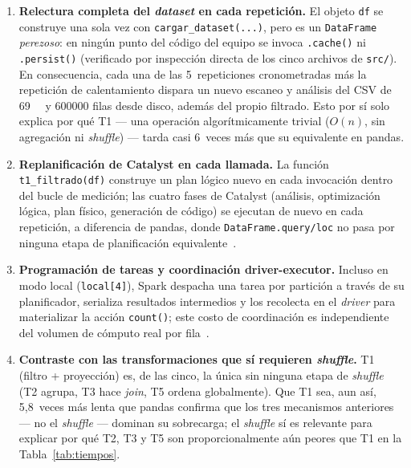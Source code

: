 \documentclass[11pt,a4paper]{article}
\begin{document}
\begin{enumerate}
  \item \textbf{Relectura completa del \textit{dataset} en cada repetici\'on.} El objeto
  \texttt{df} se construye una sola vez con \texttt{cargar\_dataset(.\allowbreak{}.\allowbreak{}.\allowbreak{})}, pero es un
  \texttt{DataFrame} \emph{perezoso}: en ning\'un punto del c\'odigo del equipo se invoca
  \texttt{.\allowbreak{}cache()} ni \texttt{.\allowbreak{}persist()} (verificado por inspecci\'on directa de los cinco
  archivos de \texttt{src/\allowbreak{}}). En consecuencia, cada una de las 5~repeticiones cronometradas
  m\'as la repetici\'on de calentamiento dispara un nuevo escaneo y an\'alisis del CSV de
  \SI{69}{\mega\byte} y \num{600000} filas desde disco, adem\'as del propio filtrado. Esto por
  s\'i solo explica por qu\'e T1 --- una operaci\'on algor\'itmicamente trivial ($O(n)$, sin
  agregaci\'on ni \textit{shuffle}) --- tarda casi 6~veces m\'as que su equivalente en pandas.
  \item \textbf{Replanificaci\'on de Catalyst en cada llamada.} La funci\'on
  \texttt{t1\_filtrado(df)} construye un plan l\'ogico nuevo en cada invocaci\'on dentro del
  bucle de medici\'on; las cuatro fases de Catalyst (an\'alisis, optimizaci\'on l\'ogica, plan
  f\'isico, generaci\'on de c\'odigo) se ejecutan de nuevo en cada repetici\'on, a diferencia
  de pandas, donde \texttt{DataFrame.\allowbreak{}query/\allowbreak{}loc} no pasa por ninguna etapa de planificaci\'on
  equivalente~\cite{armbrust2015sparksql}.
  \item \textbf{Programaci\'on de tareas y coordinaci\'on driver-executor.} Incluso en modo
  local (\texttt{local[4]}), Spark despacha una tarea por partici\'on a trav\'es de su
  planificador, serializa resultados intermedios y los recolecta en el \textit{driver} para
  materializar la acci\'on \texttt{count()}; este costo de coordinaci\'on es independiente del
  volumen de c\'omputo real por fila~\cite{dean2008mapreduce}.
  \item \textbf{Contraste con las transformaciones que s\'i requieren \textit{shuffle}.} T1
  (filtro + proyecci\'on) es, de las cinco, la \'unica sin ninguna etapa de \textit{shuffle}
  (T2 agrupa, T3 hace \textit{join}, T5 ordena globalmente). Que T1 sea, aun as\'i, 5,8~veces
  m\'as lenta que pandas confirma que los tres mecanismos anteriores --- no el
  \textit{shuffle} --- dominan su sobrecarga; el \textit{shuffle} s\'i es relevante para
  explicar por qu\'e T2, T3 y T5 son proporcionalmente a\'un peores que T1 en la
  Tabla~\ref{tab:tiempos}.
\end{enumerate}
\end{document}
